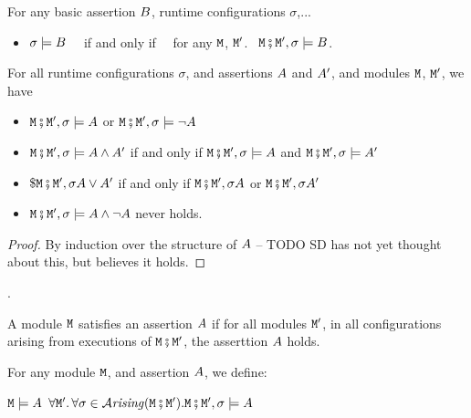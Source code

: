 \begin{lemma}
For any basic assertion $\SA$, runtime configurations $\sigma$,...
\begin{itemize}
\item $\sigma \models \SA$ \ \ if and only if \ \  for any $\M$, $\M'$. \, $\M\mkpair \M', \sigma \models\SA$.
\end{itemize}
\end{lemma}
 
\begin{lemma}
For all runtime configurations $\sigma$, and   assertions $\A$ and $\A'$, and modules
$\M$, $\M'$,
we have
\label{lemma:basic_assertions_classical}
\begin{itemize}
\item
$\M\mkpair \M', \sigma \models \A$ or  $\M\mkpair \M', \sigma \models \neg\A$
\item
$\M\mkpair \M', \sigma \models \A \wedge \A'$ \SP if and only if \SP  $\M\mkpair \M', \sigma \models \A$ and  $\M\mkpair \M', \sigma \models \A'$ 
\item
$\$\M\mkpair \M', \sigma \A \vee \A'$ \SP if and only if \SP $\M\mkpair \M', \sigma \A$ or  $\M\mkpair \M', \sigma \A'$ 
\item
$\M\mkpair \M', \sigma\models \A \wedge \neg\A$ never holds.
\end{itemize}
\end{lemma}
\begin{proof} By induction over the structure of $\A$ -- TODO  SD has not yet thought about this, but believes it holds. \end{proof}.

A module $\M$ satisfies an assertion $\A$ if for all modules $\M'$, in all configurations arising from executions of $\M\mkpair\M'$, the asserttion $\A$ holds.

\begin{definition}
\label{def:module_satisfies}
For any module $\M$, and  assertion $\A$, we define:

$\M \models \A$ \IFF  $\forall \M'.\, \forall \sigma\in \Arising{\M\mkpair\M'}.   \M\mkpair\M', \sigma \models \A$
\end{definition}

